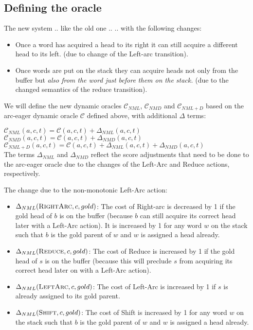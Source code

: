 \documentclass[11pt,letterpaper]{article}
\begin{document}
\subsection{Defining the oracle}

The new system .. like the old one ..
.. with the following changes:
\begin{itemize}
   \item Once a word has acquired a head to its right it can still acquire a
      different head to its left.  (due to change of the Left-arc transition).
   \item Once words are put on the stack they can acquire heads not only from
      the buffer but \textit{also from the word just before them on the
      stack.} (due to the changed semantics of the reduce transition).
\end{itemize}

We will define the new dynamic oracles $\mathcal{C}_{NML}$,
$\mathcal{C}_{NMD}$ and $\mathcal{C}_{NML+D}$ based on the arc-eager dynamic
oracle $\mathcal{C}$ defined above, with additional $\Delta$ terms:

\noindent$\mathcal{C}_{NML}(a,c,t) = \mathcal{C}(a,c,t) + \Delta_{NML}(a,c,t)$\\

\noindent$\mathcal{C}_{NMD}(a,c,t) = \mathcal{C}(a,c,t) + \Delta_{NMD}(a,c,t)$\\

\noindent$\mathcal{C}_{NML+D}(a,c,t) = \mathcal{C}(a,c,t) + \Delta_{NML}(a,c,t) + \Delta_{NMD}(a,c,t)$\\

The terms $\Delta_{NML}$ and $\Delta_{NMD}$ reflect the score adjustments that
need to be done to the arc-eager oracle due to the changes of the Left-Arc and
Reduce actions, respectively.

The change due to the non-monotonic Left-Arc action:

\begin{itemize}
   \item $\Delta_{NML}(\textsc{RightArc},c,gold)$: The cost of Right-arc is decreased by 1 if the gold head of $b$ is on the buffer
(because $b$ can still acquire its correct head later with a Left-Arc action).
It is increased by 1 for any word $w$ on the stack such that $b$ is the gold
parent of $w$ and $w$ is assigned a head already.

   \item $\Delta_{NML}(\textsc{Reduce},c,gold)$: The cost of Reduce is increased by 1 if the gold head of $s$ is on the buffer
(because this will preclude $s$ from acquiring its correct head later on with
a Left-Arc action).

   \item $\Delta_{NML}(\textsc{LeftArc},c,gold)$: The cost of Left-Arc is increased by 1 if $s$ is already assigned to its gold
parent.

  \item $\Delta_{NML}(\textsc{Shift},c,gold)$: The cost of Shift is increased by 1 for any word $w$ on the stack such that $b$ is the gold
parent of $w$ and $w$ is assigned a head already.
\end{itemize}
\end{document}

